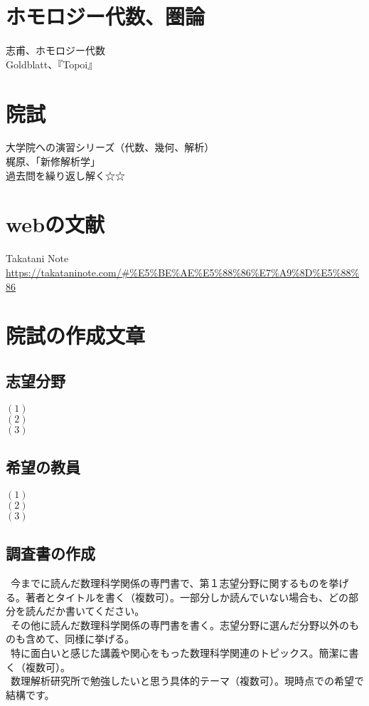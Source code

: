 \documentclass{jsarticle}
\begin{document}
\section{ホモロジー代数、圏論}
志甫、ホモロジー代数\\
Goldblatt、『Topoi』
\section{院試}
大学院への演習シリーズ（代数、幾何、解析）\\
梶原、「新修解析学」\\
過去問を繰り返し解く☆☆
\section{webの文献}
Takatani Note\\
\url{https://takataninote.com/#%E5%BE%AE%E5%88%86%E7%A9%8D%E5%88%86}

\newpage
\section{院試の作成文章}
\subsection{志望分野}
$(1)$\\
$(2)$\\
$(3)$

\subsection{希望の教員}
$(1)$\\
$(2)$\\
$(3)$

\subsection{調査書の作成}
\ 今までに読んだ数理科学関係の専門書で、第１志望分野に関するものを挙げる。著者とタイトルを書く（複数可）。一部分しか読んでいない場合も、どの部分を読んだか書いてください。\\ \newline
{}\ その他に読んだ数理科学関係の専門書を書く。志望分野に選んだ分野以外のものも含めて、同様に挙げる。\\ \newline
{}\ 特に面白いと感じた講義や関心をもった数理科学関連のトピックス。簡潔に書く（複数可）。\\ \newline
{}\ 数理解析研究所で勉強したいと思う具体的テーマ（複数可）。現時点での希望で結構です。\newline
\end{document}
